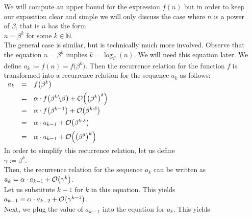 \proof
We will compute an upper bound for the expression $f(n)$ but in order to keep our exposition clear
and simple we will only discuss the case where $n$ is a power of $\beta$, that is $n$ has the form
\\[0.2cm]
\hspace*{1.3cm}
$n = \beta^k$ \quad for some $k \in \mathbb{N}$.
\\[0.2cm]
The general case is similar, but is technically much more involved.
Observe that the equation $n = \beta^k$ implies $k = \log_{\beta}(n)$.  We will need this equation later. 
We define $a_k := f(n) = f\bigl(\beta^k\bigr)$.  Then the recurrence relation for the function $f$
is transformed into a recurrence relation for the sequence $a_k$ as follows:
\\[0.2cm]
\hspace*{1.3cm}
$
\begin{array}[t]{lcl}
a_k & = & f\bigl(\beta^{k}\bigr)                                             \\[0.2cm]
    & = & \alpha \cdot f\bigl(\beta^{k} \backslash \beta\bigr) + \mathcal{O}\Bigl(\bigl(\beta^{k}\bigr)^\delta\Bigr)    \\[0.2cm]
    & = & \alpha \cdot f\bigl(\beta^{k-1}\bigr) + \mathcal{O}\bigl(\beta^{k \cdot \delta}\bigr)    \\[0.2cm]
    & = & \alpha \cdot a_{k-1} + \mathcal{O}\bigl(\beta^{k \cdot \delta}\bigr)    \\[0.2cm]
    & = & \alpha \cdot a_{k-1} + \mathcal{O}\Bigl(\bigl(\beta^{\delta}\bigr)^k\Bigr)    \\[0.2cm]
\end{array}
$
\\[0.2cm]
In order to simplify this recurrence relation, let us define
\\[0.2cm]
\hspace*{1.3cm}
$\gamma := \beta^{\delta}$.
\\[0.2cm]
Then, the recurrence relation for the sequence $a_k$ can be written as
\\[0.2cm]
\hspace*{1.3cm}
$a_k = \alpha \cdot a_{k-1} + \mathcal{O}\bigl(\gamma^k\bigr)$.
\\[0.2cm]
Let us substitute $k-1$ for $k$ in this equation.  This yields
\\[0.2cm]
\hspace*{1.3cm}
$a_{k-1} = \alpha \cdot a_{k-2} + \mathcal{O}\bigl(\gamma^{k-1}\bigr)$.
\\[0.2cm]
Next, we plug the value of $a_{k-1}$ into the equation for $a_k$.  This yields
